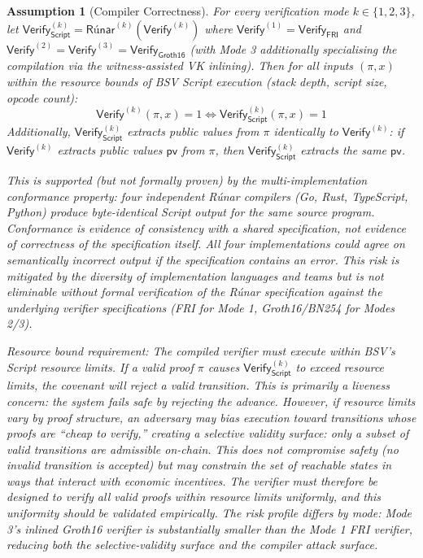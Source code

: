 \documentclass[11pt,a4paper]{article}
\newtheorem{assumption}{Assumption}[section]
\newcommand{\Verify}{\mathsf{Verify}}
\newcommand{\FRI}{\mathsf{FRI}}
\newcommand{\Groth}{\mathsf{Groth16}}    %
\newcommand{\Runar}{\textsf{R\'{u}nar}}
\begin{document}
\begin{assumption}[Compiler Correctness]\label{ass:runar}
For every verification mode $k \in \{1, 2, 3\}$, let $\Verify_{\mathsf{Script}}^{(k)} = \Runar^{(k)}(\Verify^{(k)})$ where $\Verify^{(1)} = \Verify_{\FRI}$ and $\Verify^{(2)} = \Verify^{(3)} = \Verify_{\Groth}$ (with Mode 3 additionally specialising the compilation via the witness-assisted VK inlining). Then for all inputs $(\pi, x)$ \emph{within the resource bounds of BSV Script execution} (stack depth, script size, opcode count):
\[
    \Verify^{(k)}(\pi, x) = 1 \iff \Verify_{\mathsf{Script}}^{(k)}(\pi, x) = 1
\]
Additionally, $\Verify_{\mathsf{Script}}^{(k)}$ extracts public values from $\pi$ identically to $\Verify^{(k)}$: if $\Verify^{(k)}$ extracts public values $\mathsf{pv}$ from $\pi$, then $\Verify_{\mathsf{Script}}^{(k)}$ extracts the same $\mathsf{pv}$.

This is supported (but not formally proven) by the multi-implementation conformance property: four independent \Runar{} compilers (Go, Rust, TypeScript, Python) produce byte-identical Script output for the same source program. \emph{Conformance is evidence of consistency with a shared specification, not evidence of correctness of the specification itself.} All four implementations could agree on semantically incorrect output if the specification contains an error. This risk is mitigated by the diversity of implementation languages and teams but is not eliminable without formal verification of the \Runar{} specification against the underlying verifier specifications (FRI for Mode 1, Groth16/BN254 for Modes 2/3).

\emph{Resource bound requirement}: The compiled verifier must execute within BSV's Script resource limits. If a valid proof $\pi$ causes $\Verify_{\mathsf{Script}}^{(k)}$ to exceed resource limits, the covenant will reject a valid transition. This is primarily a liveness concern: the system fails safe by rejecting the advance. However, if resource limits vary by proof structure, an adversary may bias execution toward transitions whose proofs are ``cheap to verify,'' creating a \emph{selective validity surface}: only a subset of valid transitions are admissible on-chain. This does not compromise safety (no invalid transition is accepted) but may constrain the set of reachable states in ways that interact with economic incentives. The verifier must therefore be designed to verify all valid proofs within resource limits uniformly, and this uniformity should be validated empirically. The risk profile differs by mode: Mode 3's inlined Groth16 verifier is substantially smaller than the Mode 1 FRI verifier, reducing both the selective-validity surface and the compiler attack surface.
\end{assumption}
\end{document}

